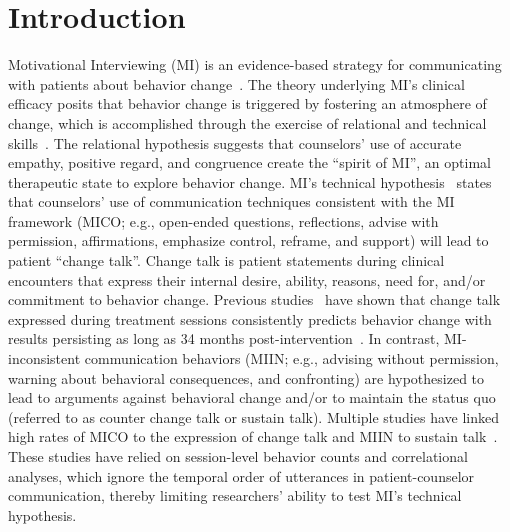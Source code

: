 \section{Introduction}
\label{sec:intro}
Motivational Interviewing (MI) is an evidence-based strategy for communicating with patients about behavior change~\cite{miller2013motivational}. The theory underlying MI’s clinical efficacy posits that behavior change is triggered by fostering an atmosphere of change, which is accomplished through the exercise of relational and technical skills~\cite{miller2013motivational}. The relational hypothesis suggests that counselors’ use of accurate empathy, positive regard, and congruence create the ``spirit of MI'', an optimal therapeutic state to explore behavior change. MI’s technical hypothesis~\cite{miller2009toward} states that counselors’ use of communication techniques consistent with the MI framework (MICO; e.g., open-ended questions, reflections, advise with permission, affirmations, emphasize control, reframe, and support) will lead to patient ``change talk''. Change talk is patient statements during clinical encounters that express their internal desire, ability, reasons, need for, and/or commitment to behavior change. Previous studies~\cite{apodaca2009mechanisms} have shown that change talk expressed during treatment sessions consistently predicts behavior change with results persisting as long as 34 months post-intervention~\cite{walker2011influence}. In contrast, MI-inconsistent communication behaviors (MIIN; e.g., advising without permission, warning about behavioral consequences, and confronting) are hypothesized to lead to arguments against behavioral change and/or to maintain the status quo (referred to as counter change talk or sustain talk). Multiple studies have linked high rates of MICO to the expression of change talk and MIIN to sustain talk~\cite{magill2014technical}. These studies have relied on session-level behavior counts and correlational analyses, which ignore the temporal order of utterances in patient-counselor communication, thereby limiting researchers’ ability to test MI’s technical hypothesis. 

